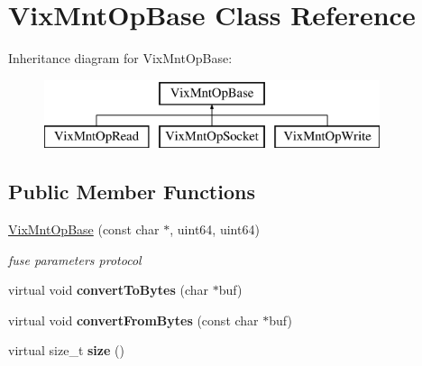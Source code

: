 \hypertarget{class_vix_mnt_op_base}{}\section{Vix\+Mnt\+Op\+Base Class Reference}
\label{class_vix_mnt_op_base}
Inheritance diagram for Vix\+Mnt\+Op\+Base\+:\begin{figure}[H]
\begin{center}
\leavevmode
\includegraphics[height=2.000000cm]{class_vix_mnt_op_base}
\end{center}
\end{figure}
\subsection*{Public Member Functions}
\begin{DoxyCompactItemize}
\item 
\hyperlink{class_vix_mnt_op_base_af6b0622766c4a457c140c3a3954740be}{Vix\+Mnt\+Op\+Base} (const char $\ast$, uint64, uint64)
\begin{DoxyCompactList}\small\item\em fuse parameters protocol \end{DoxyCompactList}\item 
\hypertarget{class_vix_mnt_op_base_a59113f1498bbe2a252cfeced60c24c71}{}\label{class_vix_mnt_op_base_a59113f1498bbe2a252cfeced60c24c71} 
virtual void {\bfseries convert\+To\+Bytes} (char $\ast$buf)
\item 
\hypertarget{class_vix_mnt_op_base_abaa96a95be1faafe18af9dfaaaaed721}{}\label{class_vix_mnt_op_base_abaa96a95be1faafe18af9dfaaaaed721} 
virtual void {\bfseries convert\+From\+Bytes} (const char $\ast$buf)
\item 
\hypertarget{class_vix_mnt_op_base_a7566a6bc2d1d918c16ccdd8d096d71ea}{}\label{class_vix_mnt_op_base_a7566a6bc2d1d918c16ccdd8d096d71ea} 
virtual size\+\_\+t {\bfseries size} ()
\end{DoxyCompactItemize}
